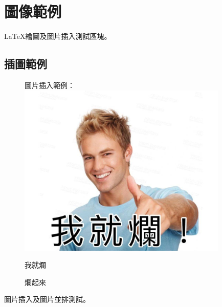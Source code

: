 \section{圖像範例}
\LaTeX 繪圖及圖片插入測試區塊。

\subsection{插圖範例}
\begin{figure}[h]
圖片插入範例： \\
   \centering
   \includegraphics[width=10cm]{../Figures/Result/我就爛}
   \caption{我就爛}\label{fig:我就爛}

   \caption{爛起來}\label{fig:爛起來}
\end{figure}
圖片插入及圖片並排測試。


